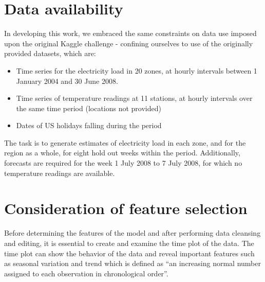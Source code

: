 \documentclass{article} %
\begin{document}
\section*{Data availability}
In developing this work, we embraced the same constraints on data use imposed upon the original Kaggle challenge - confining ourselves to use of the originally provided datasets, which are:
\begin{itemize}
\item Time series for the electricity load in 20 zones, at hourly intervals between 1 January 2004 and 30 June 2008.
\item Time series of temperature readings at 11 stations, at hourly intervals over the same time period (locations not provided)
\item Dates of US holidays falling during the period
\end{itemize}
The task is to generate estimates of electricity load in each zone, and for the region as a whole, for eight hold out weeks within the period.  Additionally, forecasts are required for the week 1 July 2008 to 7 July 2008, for which no temperature readings are available.

\section*{Consideration of feature selection}
Before determining the features of the model and after performing data cleansing and editing, it is essential to create and examine the time plot of the data. The time plot can show the behavior of the data and reveal important features such as seasonal variation and trend which is defined as “an increasing normal number assigned to each observation in chronological order”.
\end{document}
